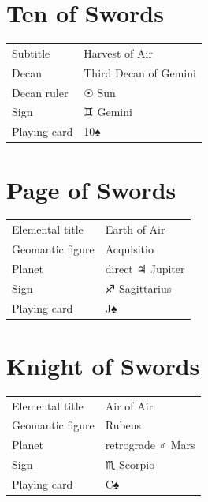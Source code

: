 \newpage
\section*{Ten of Swords}

\begin{center}
\end{center}

\vspace{4mm}
\noindent\begin{tabular}{@{}l@{\quad}l@{}}
Subtitle & Harvest of Air \\
Decan & Third Decan of Gemini \\
Decan ruler & {\symbfont ☉} Sun \\
Sign & {\symbfont ♊} Gemini \\
Playing card & 10♠ \\
\end{tabular}

\newpage
\section*{Page of Swords}

\begin{center}
\end{center}

\vspace{4mm}
\noindent\begin{tabular}{@{}l@{\quad}l@{}}
Elemental title & Earth of Air \\
Geomantic figure & Acquisitio \\
Planet & direct {\symbfont ♃} Jupiter \\
Sign & {\symbfont ♐} Sagittarius \\
Playing card & J♠ \\
\end{tabular}

\newpage
\section*{Knight of Swords}

\begin{center}
\end{center}

\vspace{4mm}
\noindent\begin{tabular}{@{}l@{\quad}l@{}}
Elemental title & Air of Air \\
Geomantic figure & Rubeus \\
Planet & retrograde {\symbfont ♂} Mars \\
Sign & {\symbfont ♏} Scorpio \\
Playing card & C♠ \\
\end{tabular}

